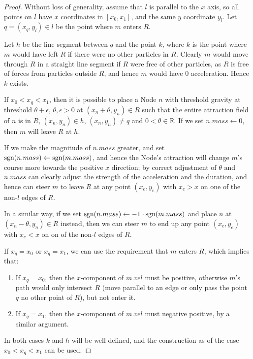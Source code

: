 \begin{proof}

    Without loss of generality, assume that $l$ is parallel to the $x$ axis, so all points on $l$ have $x$ coordinates in $[x_0, x_1]$, and the same $y$ coordinate $y_l$. Let $q = (x_q, y_l) \in l$ be the point where $m$ enters $R$.
    
    Let $h$ be the line segment between $q$ and the point $k$, where $k$ is the point where $m$ would have left $R$ if there were no other particles in $R$. Clearly $m$ would move through $R$ in a straight line segment if $R$ were free of other particles, as $R$ is free of forces from particles outside $R$, and hence $m$ would have 0 acceleration. Hence $k$ exists.
    
    If $x_0 < x_q < x_1$, then it is possible to place a Node $n$ with threshold gravity at threshold $\theta + \epsilon$, $\theta, \epsilon > 0$ at $(x_n + \theta, y_n) \in R$ such that the entire attraction field of $n$ is in $R$, $(x_n, y_n) \in h$, $(x_n, y_n) \neq q$ and $0 < \theta \in \mathbb{R}$. If we set $n.mass \leftarrow 0$, then $m$ will leave $R$ at $h$. 
    
    If we make the magnitude of $n.mass$ greater, and set $\text{sgn}(n.mass) \leftarrow \text{sgn}(m.mass)$, and hence the Node's attraction will change $m$'s course more towards the positive $x$ direction; by correct adjustment of $\theta$ and $n.mass$ can clearly adjust the strength of the acceleration and the duration, and hence can steer $m$ to leave $R$ at any point $(x_e, y_e)$ with $x_e > x$ on one of the non-$l$ edges of $R$.
    
    In a similar way, if we set $\text{sgn}(n.mass) \leftarrow -1 \cdot \text{sgn}(m.mass)$ and place $n$ at $(x_n - \theta, y_n) \in R$ instead, then we can steer $m$ to end up any point $(x_e, y_e)$ with $x_e < x$ on on of the non-$l$ edges of $R$.
    
    
    If $x_q = x_0$ or $x_q = x_1$, we can use the requirement that $m$ enters $R$, which implies that:
    \begin{enumerate}
        \item If $x_q = x_0$, then the $x$-component of $m.vel$ must be positive, otherwise $m$'s path would only intersect $R$ (move parallel to an edge or only pass the point $q$ no other point of $R$), but not enter it.
        \item If $x_q = x_1$, then the $x$-component of $m.vel$ must negative positive, by a similar argument.
    \end{enumerate}
    In both cases $k$ and $h$ will be well defined, and the construction as of the case $x_0 < x_q < x_1$ can be used.
\end{proof}


